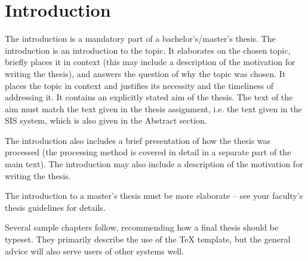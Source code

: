\chapter*{Introduction}

The introduction is a mandatory part of a bachelor's/master's thesis. The introduction is an introduction to the topic. It elaborates on the chosen topic, briefly places it in context (this may include a description of the motivation for writing the thesis), and answers the question of why the topic was chosen. It places the topic in context and justifies its necessity and the timeliness of addressing it. It contains an explicitly stated aim of the thesis. The text of the aim must match the text given in the thesis assignment, i.e. the text given in the SIS system, which is also given in the Abstract section.

The introduction also includes a brief presentation of how the thesis was processed (the processing method is covered in detail in a separate part of the main text). The introduction may also include a description of the motivation for writing the thesis.

The introduction to a master's thesis must be more elaborate -- see your faculty's thesis guidelines for details.

Several sample chapters follow, recommending how a final thesis should be typeset. They primarily describe the use of the \TeX{} template, but the general advice will also serve users of other systems well.
